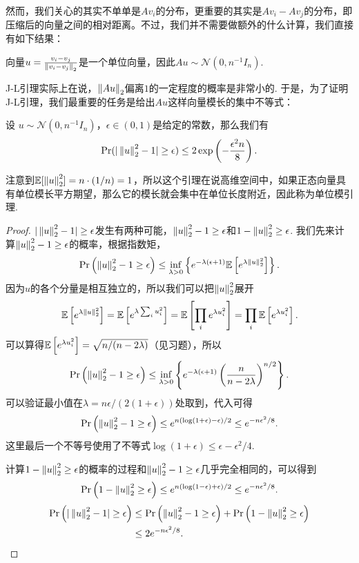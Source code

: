 然而，我们关心的其实不单单是$Av_i$的分布，更重要的其实是$Av_i-Av_j$的分布，即压缩后的向量之间的相对距离。不过，我们并不需要做额外的什么计算，我们直接有如下结果：

\begin{lemma}\label{lemma:gaussian-vector-diff}
    向量$u=\frac{v_i-v_j}{\left\|v_i-v_j\right\|_2}$是一个单位向量，因此$Au\sim \mathcal N(0,n^{-1}I_n)$.
\end{lemma}

J-L引理实际上在说，$\left\|Au\right\|_2$偏离$1$的一定程度的概率是非常小的. 于是，为了证明J-L引理，我们最重要的任务是给出$Au$这样向量模长的集中不等式：
\begin{lemma}[单位模引理]\label{lemma:unit-mod-lemma}
    设 $u\sim \mathcal N(0,n^{-1}I_n)$，$\epsilon \in (0,1 )$是给定的常数，那么我们有
    \[
        \Pr(|\left\|u\right\|_2^2 - 1| \geq \epsilon) \leq 2\exp \left(-\frac{\epsilon^2 n}{8}\right).
    \]
\end{lemma}
注意到$\mathbb{E}[\left\|u\right\|_2^2]=n\cdot(1/n)=1$，所以这个引理在说高维空间中，如果正态向量具有单位模长平方期望，那么它的模长就会集中在单位长度附近，因此称为单位模引理.

\begin{proof}
$|\left\|u\right\|_2^2 - 1| \geq \epsilon$发生有两种可能，$ \left\|u\right\|_2^2 - 1 \geq \epsilon$和$ 1 - \left\|u\right\|_2^2 \geq \epsilon$. 我们先来计算$ \left\|u\right\|_2^2 - 1 \geq \epsilon$的概率，根据指数矩，
    \[
    \Pr\left(\left\|u\right\|_2^2 - 1 \geq \epsilon\right) \leq \inf_{\lambda > 0} \left\{e^{- \lambda (\epsilon + 1)} \mathbb{E} \left[e^{\lambda \left\|u\right\|_2^2}\right]\right\}. 
    \]
因为$u$的各个分量是相互独立的，所以我们可以把$\left\|u\right\|_2^2$展开
    \[
    \mathbb{E}\left[e^{\lambda \left\|u\right\|_2^2}\right] = \mathbb{E}\left[e^{\lambda \sum_i u_i^2}\right] = \mathbb{E}\left[\prod_i e^{\lambda u_i^2}\right] = \prod_i \mathbb{E}\left[e^{\lambda u_i^2}\right]. 
    \]
可以算得$\mathbb{E}\left[e^{\lambda u_i^2}\right]= \sqrt{n/(n-2\lambda)}$（见习题），所以
    \[
    \Pr\left(\left\|u\right\|_2^2 - 1 \geq \epsilon\right) \leq \inf_{\lambda > 0} \left\{e^{- \lambda (\epsilon + 1)} \left(\frac{n}{n-2\lambda} \right)^{n/2}\right\}. 
    \]
可以验证最小值在$\lambda = n\epsilon/(2(1+\epsilon))$处取到，代入可得
    \[
    \Pr\left(\left\|u\right\|_2^2 - 1 \geq \epsilon\right) \leq e^{n(\log (1+\epsilon) - \epsilon)/2} \leq e^{-n\epsilon^2/8}. 
    \]
这里最后一个不等号使用了不等式$\log(1+\epsilon)\leq\epsilon-\epsilon^2/4$. 

计算$1 - \left\|u\right\|_2^2 \geq \epsilon$的概率的过程和$\left\|u\right\|_2^2 - 1 \geq \epsilon$几乎完全相同的，可以得到
    \[
    \Pr\left(1 - \left\|u\right\|_2^2 \geq \epsilon\right) \leq e^{n(\log (1-\epsilon) + \epsilon)/2} \leq e^{-n\epsilon^2/8}. 
    \]
    \begin{align*}
        \Pr\left(| \left\|u\right\|_2^2 - 1| \geq \epsilon\right) &\leq \Pr\left(\left\|u\right\|_2^2 - 1 \geq \epsilon\right) + \Pr\left(1 - \left\|u\right\|_2^2 \geq \epsilon\right) \\
        &\leq 2e^{-n\epsilon^2/8}. 
    \end{align*}
\end{proof}

